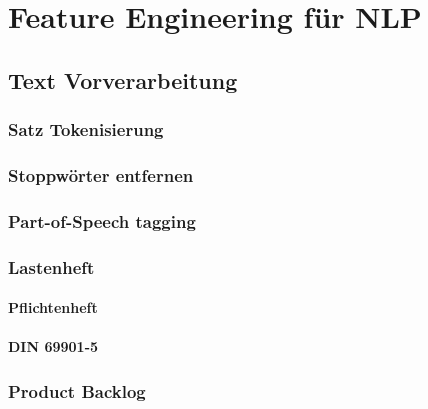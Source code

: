 \chapter{Feature Engineering für NLP}

\lipsum[2-3]

\section{Text Vorverarbeitung}

\lipsum[2-3]

\subsection{Satz Tokenisierung}

\lipsum[2-3]

\subsection{Stoppwörter entfernen}

\lipsum[2-3]

\subsection{Part-of-Speech tagging}

\lipsum[3-5]

\subsection{Lastenheft}

\subsubsection{Pflichtenheft}

\lipsum[3-5]

\subsubsection{DIN 69901-5}

\lipsum[3-5]

\subsection{Product Backlog}

\lipsum[3-5]

